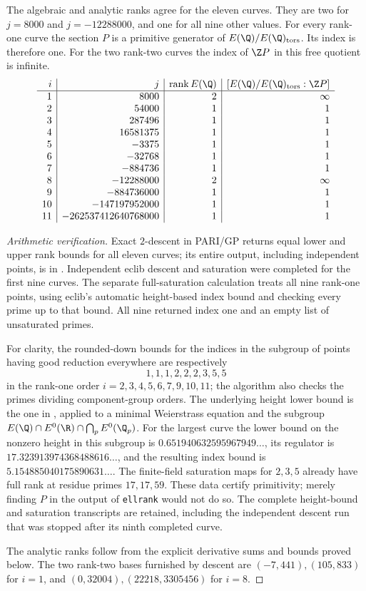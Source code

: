 \begin{proposition}\label{ari:C.6.R1}
The algebraic and analytic ranks agree for the eleven curves. They are
two for $j=8000$ and $j=-12288000$, and one for all nine other values.
For every rank-one curve the section $P$ is a primitive generator of
$E(\Q)/E(\Q)_{\rm tors}$. Its index is therefore one. For the two
rank-two curves the index of $\Z P$ in this free quotient is infinite.
\[
\begin{array}{r|r|r|r}
i&j&\operatorname{rank}E(\Q)&[E(\Q)/E(\Q)_{\rm tors}:\Z P]\\\hline
1&8000&2&\infty\\
2&54000&1&1\\
3&287496&1&1\\
4&16581375&1&1\\
5&-3375&1&1\\
6&-32768&1&1\\
7&-884736&1&1\\
8&-12288000&2&\infty\\
9&-884736000&1&1\\
10&-147197952000&1&1\\
11&-262537412640768000&1&1
\end{array}
\]
\end{proposition}
\begin{proof}[Arithmetic verification]
Exact $2$-descent in PARI/GP returns equal lower and upper rank bounds
for all eleven curves; its entire output, including independent points,
is in . Independent eclib descent
and saturation were completed for the first nine curves. The separate
full-saturation calculation  treats
all nine rank-one points, using eclib's automatic height-based index
bound and checking every prime up to that bound. All nine returned
index one and an empty list of unsaturated primes.

For clarity, the rounded-down bounds for the indices in the subgroup
of points having good reduction everywhere are respectively
\[
 1,1,1,2,2,2,3,5,5
\]
in the rank-one order $i=2,3,4,5,6,7,9,10,11$; the algorithm also
checks the primes dividing component-group orders. The underlying
height lower bound is the one in
\citet[Theorem 1]{CrCremonaSiksek2006}, applied to a minimal
Weierstrass equation and the subgroup
$E(\Q)\cap E^0(\R)\cap\bigcap_pE^0(\Q_p)$.
For the largest curve the lower bound on the nonzero height in this
subgroup is $0.651940632595967949\ldots$, its regulator is
$17.323913974368488616\ldots$, and the resulting index bound is
$5.154885040175890631\ldots$. The finite-field saturation maps for
$2,3,5$ already have full rank at residue primes $17,17,59$.
These data certify primitivity; merely finding $P$ in the output of
\texttt{ellrank} would not do so. The complete height-bound and
saturation transcripts are retained, including the independent
descent run that was stopped after its ninth completed curve.

The analytic ranks follow from the explicit derivative sums and bounds
proved below. The two rank-two bases furnished by descent are
$(-7,441),(105,833)$ for $i=1$, and
$(0,32004),(22218,3305456)$ for $i=8$.
\end{proof}

